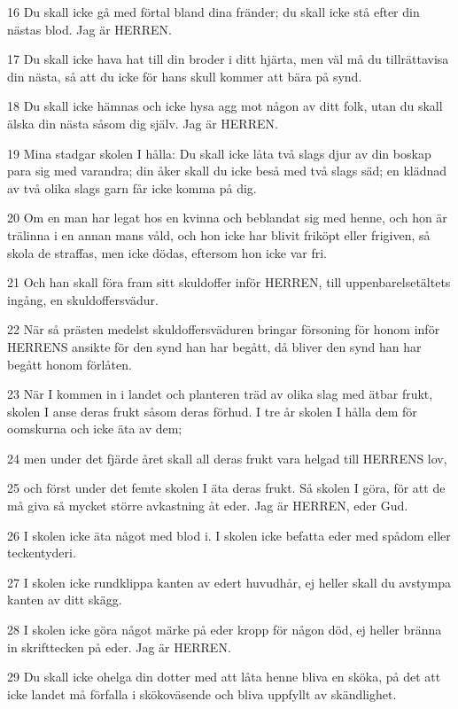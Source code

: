 \par 16 Du skall icke gå med förtal bland dina fränder; du skall icke stå efter din nästas blod. Jag är HERREN.
\par 17 Du skall icke hava hat till din broder i ditt hjärta, men väl må du tillrättavisa din nästa, så att du icke för hans skull kommer att bära på synd.
\par 18 Du skall icke hämnas och icke hysa agg mot någon av ditt folk, utan du skall älska din nästa såsom dig själv. Jag är HERREN.
\par 19 Mina stadgar skolen I hålla: Du skall icke låta två slags djur av din boskap para sig med varandra; din åker skall du icke beså med två slags säd; en klädnad av två olika slags garn får icke komma på dig.
\par 20 Om en man har legat hos en kvinna och beblandat sig med henne, och hon är trälinna i en annan mans våld, och hon icke har blivit friköpt eller frigiven, så skola de straffas, men icke dödas, eftersom hon icke var fri.
\par 21 Och han skall föra fram sitt skuldoffer inför HERREN, till uppenbarelsetältets ingång, en skuldoffersvädur.
\par 22 När så prästen medelst skuldoffersväduren bringar försoning för honom inför HERRENS ansikte för den synd han har begått, då bliver den synd han har begått honom förlåten.
\par 23 När I kommen in i landet och planteren träd av olika slag med ätbar frukt, skolen I anse deras frukt såsom deras förhud. I tre år skolen I hålla dem för oomskurna och icke äta av dem;
\par 24 men under det fjärde året skall all deras frukt vara helgad till HERRENS lov,
\par 25 och först under det femte skolen I äta deras frukt. Så skolen I göra, för att de må giva så mycket större avkastning åt eder. Jag är HERREN, eder Gud.
\par 26 I skolen icke äta något med blod i. I skolen icke befatta eder med spådom eller teckentyderi.
\par 27 I skolen icke rundklippa kanten av edert huvudhår, ej heller skall du avstympa kanten av ditt skägg.
\par 28 I skolen icke göra något märke på eder kropp för någon död, ej heller bränna in skrifttecken på eder. Jag är HERREN.
\par 29 Du skall icke ohelga din dotter med att låta henne bliva en sköka, på det att icke landet må förfalla i skökoväsende och bliva uppfyllt av skändlighet.
